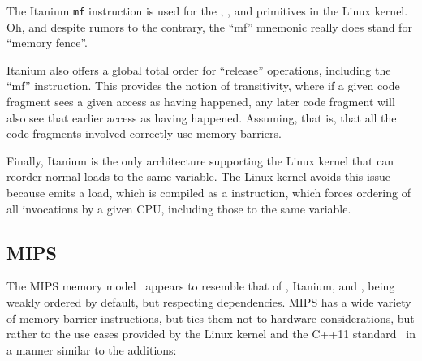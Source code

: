 The Itanium {\tt mf} instruction is used for the ,
, and  primitives in the Linux kernel.
Oh, and despite rumors to the contrary, the ``mf'' mnemonic really
does stand for ``memory fence''.

Itanium also offers a global total order for ``release'' operations,
including the ``mf'' instruction.
This provides the notion of transitivity, where if a given code fragment
sees a given access as having happened, any later code fragment will
also see that earlier access as having happened.
Assuming, that is, that all the code fragments involved correctly use
memory barriers.

Finally, Itanium is the only architecture supporting the Linux kernel
that can reorder normal loads to the same variable.
The Linux kernel avoids this issue because  emits
a  load, which is compiled as a  instruction,
which forces ordering of all  invocations by a given
CPU, including those to the same variable.

\subsection{MIPS}

The MIPS memory model~\cite[page~479]{MIPSvII-A-2017}
appears to resemble that of \ARM, Itanium, and \Power{},
being weakly ordered by default, but respecting dependencies.
MIPS has a wide variety of memory-barrier instructions, but ties them
not to hardware considerations, but rather to the use cases provided
by the Linux kernel and the C++11 standard~\cite{RichardSmith2015N4527}
in a manner similar to the  additions:

